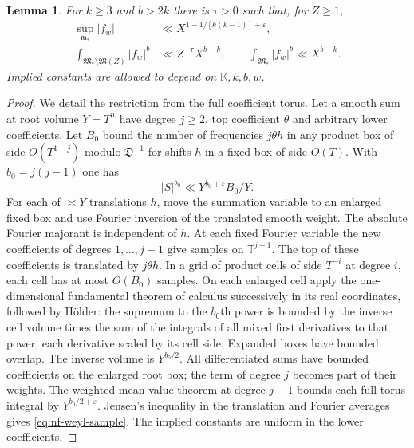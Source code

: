 \documentclass[11pt,letterpaper]{article}
\newtheorem{lemma}[lemma]{Lemma}
\theoremstyle{definition}
\numberwithin{equation}{section}
\begin{document}
\begin{lemma}\label{lem:nf-ordinary}
For $k\ge3$ and $b>2k$ there is $\tau>0$ such that, for $Z\ge1$,
\begin{align}
 \sup_{\mathfrak m_*}|f_w|&\ll X^{1-1/[k(k-1)]+\varepsilon},
 \label{eq:nf-point}\\
 \int_{\mathfrak M_*\setminus\mathfrak M(Z)}|f_w|^b
 &\ll Z^{-\tau}X^{b-k},\qquad
 \int_{\mathfrak M_*}|f_w|^b\ll X^{b-k}.
 \label{eq:nf-prune}
\end{align}
Implied constants are allowed to depend on $\mathbb K,k,b,w$.
\end{lemma}
\begin{proof}
We detail the restriction from the full coefficient torus. Let a
smooth sum at root volume $Y=T^n$ have degree $j\ge2$, top coefficient
$\theta$ and arbitrary lower coefficients. Let $B_0$ bound the number
of frequencies $j\theta h$ in any product box of side
$O(T^{1-j})$ modulo $\mathfrak D^{-1}$ for shifts $h$ in a fixed
box of side $O(T)$. With $b_0=j(j-1)$ one has
\begin{equation}\label{eq:nf-weyl-sample}
 |S|^{b_0}\ll Y^{b_0+\varepsilon}B_0/Y .
\end{equation}
For each of $\asymp Y$ translations $h$, move the summation variable
to an enlarged fixed box and use Fourier inversion of the translated
smooth weight. The absolute Fourier majorant is independent of $h$.
At each fixed Fourier variable the new coefficients of degrees
$1,\ldots,j-1$ give samples on $\mathbb T^{j-1}$. The top of these
coefficients is translated by $j\theta h$. In a grid of product
cells of side $T^{-i}$ at degree $i$, each cell has at most $O(B_0)$
samples. On each enlarged cell apply the one-dimensional fundamental
theorem of calculus successively in its real coordinates, followed
by H\"older: the supremum to the $b_0$th power is bounded by the
inverse cell volume times the sum of the integrals of all mixed first
derivatives to that power, each derivative scaled by its cell side.
Expanded boxes have bounded overlap. The inverse volume is
$Y^{b_0/2}$. All differentiated sums have bounded coefficients
on the enlarged root box; the term of degree $j$ becomes part of
their weights. The weighted mean-value theorem
\cite[Theorem~15.1]{NFWooley} at degree $j-1$ bounds each full-torus
integral by $Y^{b_0/2+\varepsilon}$. Jensen's inequality in the
translation and Fourier averages gives \eqref{eq:nf-weyl-sample}.
The implied constants are uniform in the lower coefficients.


\end{proof}
\end{document}
